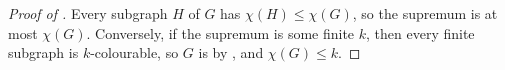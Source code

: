 \begin{proof}[Proof of ]
    Every subgraph $H$ of $G$ has $\chi(H) \leq \chi(G)$, so the supremum is at most $\chi(G)$. Conversely, if the supremum is some finite $k$, then every finite subgraph is $k$-colourable, so $G$ is by , and $\chi(G) \leq k$.
\end{proof}
